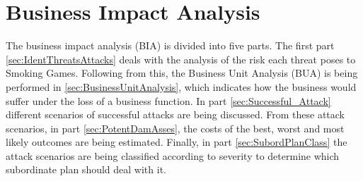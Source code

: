 \chapter{Business Impact Analysis}
The business impact analysis (BIA) is divided into five parts\cite{whitman1}. The first part \ref{sec:IdentThreatsAttacks} deals with the analysis of the risk each threat poses to Smoking Games. Following from this, the Business Unit Analysis (BUA) is being performed in \ref{sec:BusinessUnitAnalysis}, which indicates how the business would suffer under the loss of a business function. In part \ref{sec:Successful_Attack} different scenarios of successful attacks are being discussed. From these attack scenarios, in part \ref{sec:PotentDamAsses}, the costs of the best, worst and most likely outcomes are being estimated. Finally, in part \ref{sec:SubordPlanClass} the attack scenarios are being classified according to severity to determine which subordinate plan should deal with it.






